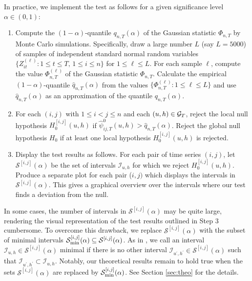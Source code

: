 \documentclass[12pt]{article}
\begin{document}
In practice, we implement the test as follows for a given significance level $\alpha \in (0, 1)$:
\begin{enumerate}[label=\textit{Step \arabic*.}, leftmargin=1.45cm,itemsep=0pt,parsep=0pt,topsep=3pt]
\item Compute the $(1-\alpha)$-quantile $q_{n, T}(\alpha)$ of the Gaussian statistic $\Phi_{n,T}$ by Monte Carlo simulations. Specifically, draw a large number $L$ (say $L=5000$) of samples of independent standard normal random variables $\{Z_{it}^{(\ell)} : 1 \le t \le T, \, 1 \le i \le n \}$ for $1 \le \ell \le L$. For each sample $\ell$, compute the value $\Phi_{n,T}^{(\ell)}$ of the Gaussian statistic $\Phi_{n, T}$. Calculate the empirical $(1-\alpha)$-quantile $\widehat{q}_{n, T}(\alpha)$ from the values $\{ \Phi_{n, T}^{(\ell)}: 1 \le \ell \le L \}$ and use $\widehat{q}_{n, T}(\alpha)$ as an approximation of the quantile $q_{n, T}(\alpha)$.
\item For each $(i, j)$ with $1 \le i < j \le n$ and each $(u, h) \in \mathcal{G}_T$, reject the local null hypothesis $H_0^{[i, j]}(u, h)$ if $\widehat{\psi}^0_{ij, T}(u, h)> \widehat{q}_{n, T}(\alpha)$. Reject the global null hypothesis $H_0$ if at least one local hypothesis $H_0^{[i, j]}(u, h)$ is rejected. 
\item Display the test results as follows. For each pair of time series $(i,j)$, let $\mathcal{S}^{[i, j]}(\alpha)$ be the set of intervals $\mathcal{I}_{u, h}$ for which we reject $H_0^{[i, j]}(u, h)$. Produce a separate plot for each pair ($i,j)$ which displays the intervals in $\mathcal{S}^{[i, j]}(\alpha)$. This gives a graphical overview over the intervals where our test finds a deviation from the null. 
\end{enumerate}


\pagebreak
\begin{remark} 
In some cases, the number of intervals in $\mathcal{S}^{[i, j]}(\alpha)$ may be quite large, rendering the visual representation of the test results outlined in Step 3 cumbersome. To overcome this drawback, we replace $\mathcal{S}^{[i, j]}(\alpha)$ with the subset of minimal intervals $\mathcal{S}^{[i, j]}_{\textnormal{min}}(\alpha) \subseteq \mathcal{S}^{[i, j]}(\alpha)$. As in \cite{Duembgen2002}, we call an interval $\mathcal{I}_{u, h} \in \mathcal{S}^{[i, j]}(\alpha)$ minimal if there is no other interval $\mathcal{I}_{u^\prime, h^\prime} \in \mathcal{S}^{[i, j]}(\alpha)$ such that $\mathcal{I}_{u^\prime, h^\prime} \subset \mathcal{I}_{u, h}$. Notably, our theoretical results remain to hold true when the sets $\mathcal{S}^{[i, j]}(\alpha)$ are replaced by $\mathcal{S}^{[i, j]}_{\textnormal{min}}(\alpha)$. See Section \ref{sec:theo} for the details. 
\end{remark}
\end{document}
